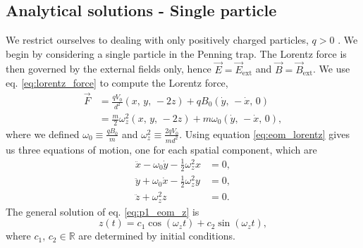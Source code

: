 \subsection{Analytical solutions - Single particle}\label{subsec_methods:single_particle_analytical}
We restrict ourselves to dealing with only positively charged particles, $q>0$ . We begin by considering a single particle in the Penning trap. The Lorentz force is then governed by the external fields only, hence $\vec{E} = \vec{E}_\mathrm{ext}$ and $\vec{B} = \vec{B}_\mathrm{ext}$. We use eq. \eqref{eq:lorentz_force} to compute the Lorentz force, 
\begin{align}
    \vec{F} &= \frac{q V_0}{d^2}(x,\,y,\,-2z) + q B_0 (\dot{y},\,-\dot{x},\,0) \nonumber\\
    &= \frac{m}{2}\omega_z^2 (x,\,y,\,-2z) + m \omega_0 (\dot{y},\,-\dot{x},\,0),\label{eq:p1_lorentz_force_penning}
\end{align}
where we defined $\omega_0 \equiv \frac{qB_0}{m}$ and $\omega_z^2 \equiv \frac{2qV_0}{m d^2}$. Using equation \eqref{eq:eom_lorentz} gives us three equations of motion, one for each spatial component, which are 
\begin{subequations}\label{eq:p1_eom_xyz}
    \begin{align}
        \ddot{x} - \omega_0 \dot{y} - \frac{1}{2} \omega_z^2 x &= 0, \label{eq:p1_eom_x} \\ 
        \ddot{y} + \omega_0 \dot{x} - \frac{1}{2} \omega_z^2 y &= 0, \label{eq:p1_eom_y} \\ 
        \ddot{z} + \omega_z^2 z &= 0. \label{eq:p1_eom_z}
    \end{align}
\end{subequations}
The general solution of eq. \eqref{eq:p1_eom_z} is
\begin{equation}
    z(t) = c_1 \cos(\omega_z t) + c_2 \sin(\omega_z t), \label{eq:p1_diffeq_solution_z}
\end{equation}
where $c_1,\, c_2 \in \mathbb{R}$ are determined by initial conditions.

